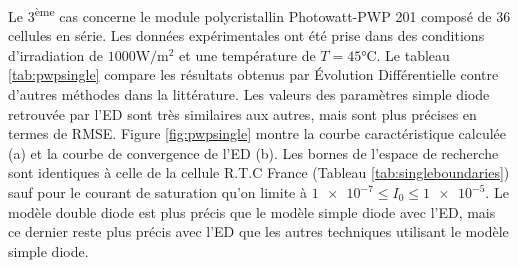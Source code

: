 Le 3\textsuperscript{ème} cas concerne le module polycristallin Photowatt-PWP 201 composé de 36 cellules en série. Les données expérimentales ont été prise dans des conditions d'irradiation de $1000 \si{\watt\per\square\meter}$ et une température de $T = 45 \si{\celsius}$. Le tableau \ref{tab:pwpsingle} compare les résultats obtenus par Évolution Différentielle contre d'autres méthodes dans la littérature. Les valeurs des paramètres simple diode retrouvée par l'ED sont très similaires aux autres, mais sont plus précises en termes de RMSE. Figure \ref{fig:pwpsingle} montre la courbe caractéristique calculée (a) et la courbe de convergence de l'ED (b). Les bornes de l'espace de recherche sont identiques à celle de la cellule R.T.C France (Tableau \ref{tab:singleboundaries}) sauf pour le courant de saturation qu'on limite à $\num{1e-7} \leq I_{0} \leq \num{1e-5}$. Le modèle double diode est plus précis que le modèle simple diode avec l'ED, mais ce dernier reste plus précis avec l'ED que les autres techniques utilisant le modèle simple diode.

